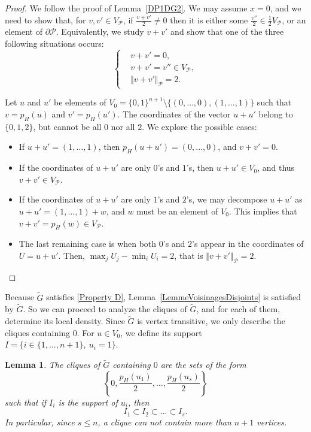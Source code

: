 \documentclass{amsart}                     %
\newtheorem{lemm}{Lemma}
\newcommand{\lref}[1]{Lemma~\textup{\ref{#1}}}
\begin{document}
\begin{proof}
We follow the proof of \lref{DP1DG2}. We may assume $x=0$, and we need to show that, for $v,v'\in V_{\mathcal{P}}$, if $\frac{v+v'}{2}\neq 0$ then it is either some $\frac{v''}{2}\in \frac{1}{2}V_{\mathcal{P}}$, or an element of $\partial \mathcal{P}$. Equivalently, we study $v+v'$ and show that one of the three following situations occurs:
$$\begin{cases} & v+v'=0, \\ & v+v'=v''\in V_\mathcal{P}, \\& \Vert  v+v'\Vert  _\mathcal{P}=2. \end{cases}$$


Let $u$ and $u'$ be elements of $V_0=\{0,1\}^{n+1} \setminus \{ (0,\ldots,0),(1,\ldots,1)\}$ such that $v=p_H(u)$ and $v'=p_H(u')$. The coordinates of the vector $u+u'$ belong to $\{0,1,2\}$, but  cannot be all $0$ nor all $2$. We explore the  possible cases:
\begin{itemize}
\item If $u+u'=(1, \ldots, 1)$, then $p_H(u+u')=(0, \ldots ,0)$, and $v+v'=0$.
\item If the coordinates of $u+u'$ are only $0$'s and $1$'s, then $u+u'\in V_0$, and thus $v+v'\in V_\mathcal{P}$.
\item If the coordinates of $u+u'$ are only $1$'s and $2$'s, we may decompose $u+u'$ as ${u+u'= (1,\ldots,1) + w}$, and $w$ must be an element of $V_0$. This implies that $v+v'=p_H(w)\in V_\mathcal{P}$.
\item The last  remaining case is when both $0$'s and $2$'s appear in the coordinates of $U=u+u'$. 
Then, $\max_j U_j - \min_i U_i=2$, that is $\Vert  v+v'\Vert  _\mathcal{P}=2$.
\end{itemize}
\end{proof}

Because $\tilde{G}$ satisfies \eqref{Property D},  \lref{LemmeVoisinagesDisjoints} is satisfied by $\tilde{G}$. So we can proceed to analyze  the cliques of $\tilde{G}$, and for each of them, determine its local density. Since $\tilde{G}$ is vertex transitive, we only describe the cliques containing $0$. For $u\in V_0$, we define its support  $I=\{ i \in \{1,\ldots,n+1\}, \ u_i=1\}$.

\begin{lemm}
The cliques of $\tilde{G}$ containing $0$ are the sets of the form $$\left\{0,\frac{p_H(u_1)}{2},\ldots,\frac{p_H(u_s)}{2}\right\}$$ such that if $I_i$ is the support of $u_i$, then 
$$ I_1\subset I_2 \subset \ldots \subset I_s.$$
In particular, since $s\leq n$, a clique can not contain more than $n+1$ vertices. 
\end{lemm}
\end{document}
